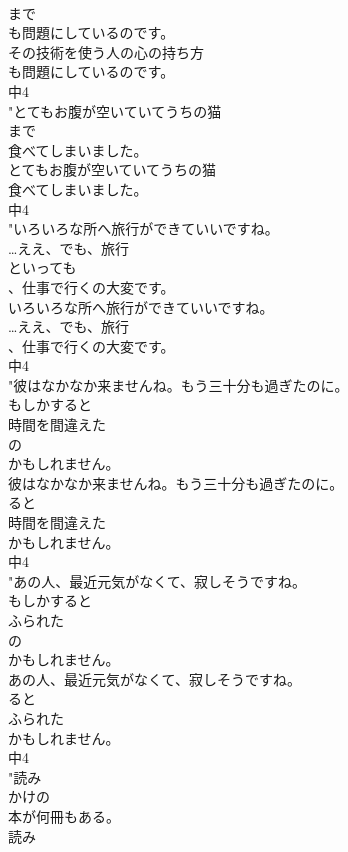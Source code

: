 \documentclass[8pt]{extreport}
\begin{document}
\begin{CJK}{UTF8}{min}
\\	まで
\\	も問題にしているのです。
\\	その技術を使う人の心の持ち方
\\	も問題にしているのです。
\\	中4
\\	"とてもお腹が空いていてうちの猫
\\	まで
\\	食べてしまいました。
\\	とてもお腹が空いていてうちの猫
\\	食べてしまいました。
\\	中4
\\	"いろいろな所へ旅行ができていいですね。
\\	…ええ、でも、旅行
\\	といっても
\\	、仕事で行くの大変です。
\\	いろいろな所へ旅行ができていいですね。
\\	…ええ、でも、旅行
\\	、仕事で行くの大変です。
\\	中4
\\	"彼はなかなか来ませんね。もう三十分も過ぎたのに。
\\	もしかすると
\\	時間を間違えた
\\	の
\\	かもしれません。
\\	彼はなかなか来ませんね。もう三十分も過ぎたのに。
\\	ると
\\	時間を間違えた
\\	かもしれません。
\\	中4
\\	"あの人、最近元気がなくて、寂しそうですね。
\\	もしかすると
\\	ふられた
\\	の
\\	かもしれません。
\\	あの人、最近元気がなくて、寂しそうですね。
\\	ると
\\	ふられた
\\	かもしれません。
\\	中4
\\	"読み
\\	かけの
\\	本が何冊もある。
\\	読み

\end{CJK}
\end{document}
